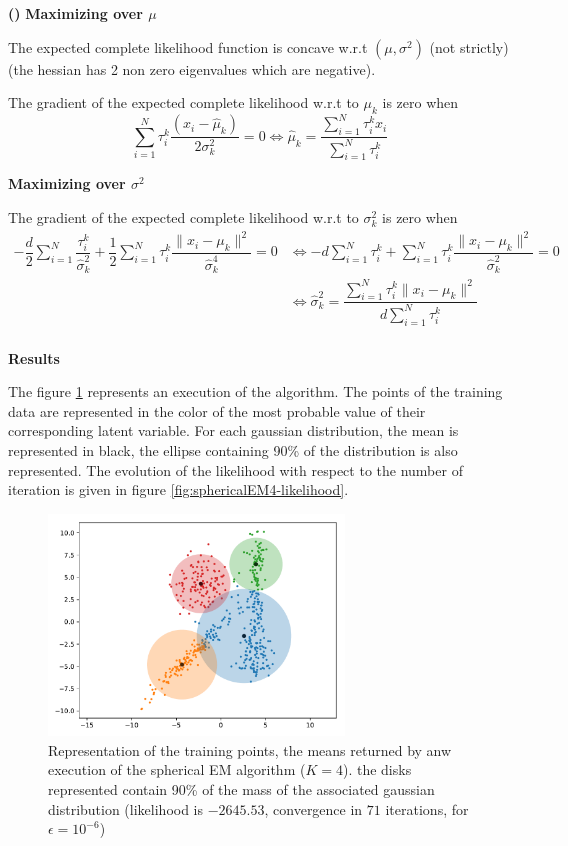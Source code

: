 \documentclass[a4paper, 11pt]{article}
\newcounter{cquestion}[subsection]
\newcounter{csubquestion}[cquestion]
\renewcommand{\thecsubquestion}{\alph{csubquestion}}
\newenvironment{subquestion}
{\par \vspace{0.5em} \noindent \stepcounter{csubquestion} \hspace{-1em}
 \textbf{(\thecsubquestion)}}
{}
\newcommand{\norm}[1]{\|#1\|}
\newcommand{\wrt}{w.r.t }
\newcommand{\ipart}[1]{\vspace{0.5em}\textbf{#1}\vspace{0.5em}}
\begin{document}
\begin{subquestion}
  \ipart{Maximizing over $\mu$}

  The expected complete likelihood function is concave \wrt
  $(\mu, \sigma^2)$ (not strictly) (the hessian has 2 non zero
  eigenvalues which are negative).

  The gradient of the expected complete likelihood \wrt to $\mu_k$
  is zero when
  \begin{equation*}
    \sum_{i = 1}^N\tau_i^k \dfrac{(x_i - \hat{\mu}_k)}{2 \sigma_k^2} = 0 \iff \hat{\mu}_k = \dfrac{\sum_{i = 1}^N\tau_i^k x_i}{\sum_{i = 1}^N\tau_i^k}
  \end{equation*}

  \ipart{Maximizing over $\sigma^2$}

  The gradient of the expected complete likelihood \wrt to $\sigma_k^2$
  is zero when
  \begin{align*}
    - \dfrac{d}{2} \sum_{i = 1}^N\dfrac{\tau_i^k}{\hat{\sigma}_k^2} + \dfrac{1}{2} \sum_{i = 1}^N \tau_i^k \dfrac{\norm{x_i - \mu_k}^2}{\hat{\sigma}_k^4} = 0
    & \iff - d \sum_{i = 1}^N \tau_i^k + \sum_{i = 1}^N \tau_i^k \dfrac{\norm{x_i - \mu_k}^2}{\hat{\sigma}_k^2} = 0 \\
    & \iff \hat{\sigma}_k^2 = \dfrac{\sum_{i = 1}^N \tau_i^k \norm{x_i - \mu_k}^2}{d \sum_{i = 1}^N \tau_i^k} \\
  \end{align*}

  \ipart{Results}

  The figure \ref{fig:sphericalEM4-success} represents an execution of
  the algorithm. The points of the training data are represented in
  the color of the most probable value of their corresponding latent
  variable. For each gaussian distribution, the mean is represented in
  black, the ellipse containing 90\% of the distribution is also
  represented. The evolution of the likelihood with respect to the
  number of iteration is given in figure
  \ref{fig:sphericalEM4-likelihood}.

  \begin{figure}[h!]
    \centering
    \includegraphics[width=0.7\textwidth]{sphericalEM4_success.pdf}
    \caption{Representation of the training points, the means returned
      by anw execution of the spherical EM algorithm ($K = 4$). the
      disks represented contain 90\% of the mass of the associated
      gaussian distribution (likelihood is $-2645.53$, convergence in $71$
      iterations, for $\epsilon = 10^{-6}$)}\label{fig:sphericalEM4-success}
  \end{figure}


\end{subquestion}
\end{document}
